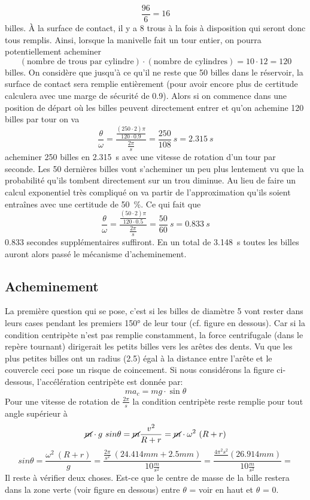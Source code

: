 \[\frac{\num{96}}{\num{6}} = \num{16}\]
billes. À la surface de contact, il y a \num{8} trous à la fois à disposition qui seront donc tous remplis. Ainsi, lorsque la manivelle fait un tour entier, on pourra potentiellement acheminer 
\[(\text{nombre de trous par cylindre}) \cdot (\text{nombre de cylindres}) = \num{10} \cdot \num{12} = \num{120}\]
billes.
On considère que jusqu'à ce qu'il ne reste que \num{50} billes dans le réservoir, la surface de contact sera remplie entièrement (pour avoir encore plus de certitude calculera avec une marge de sécurité de \num{0.9}).
Alors si on commence dans une position de départ où les billes peuvent directement entrer et qu'on achemine \num{120} billes par tour on va
\[\frac{\theta}{\omega} = \frac{\frac{(250 \cdot 2)\pi}{120 \cdot 0.9}}{\frac{2\pi}{s}} = \frac{250}{108} \ s = 2.315 \ s \]
acheminer 250 billes en \SI{2.315}{\s} avec une vitesse de rotation d'un tour par seconde.
Les 50 dernières billes vont s'acheminer un peu plus lentement vu que la probabilité qu'ils tombent directement sur un trou diminue. Au lieu de faire un calcul exponentiel très compliqué on va partir de l'approximation qu'ils soient entraînes avec une certitude de \SI{50}{\percent}. Ce qui fait que
\[\frac{\theta}{\omega} = \frac{\frac{(50 \cdot 2)\pi}{120 \cdot 0.5}}{\frac{2 \pi}{s}} = \frac{50}{60} \ s = 0.833 \ s\]
0.833 secondes supplémentaires suffiront.
En un total de 3.148~s toutes les billes auront alors passé le mécanisme d'acheminement.
\subsection{Acheminement}
La première question qui se pose, c'est si les billes de diamètre 5 vont rester dans leurs cases pendant les premiers \ang{150} de leur tour (cf. figure en dessous). Car si la condition centripète n'est pas remplie constamment, la force centrifugale (dans le repère tournant) dirigerait les petits billes vers les arêtes des dents. Vu que les plus petites billes ont un radius (2.5) égal à la distance entre l'arête et le couvercle ceci pose un risque de coincement. Si nous considérons la figure ci-dessous, l'accélération centripète est donnée par:
\[ma_{c} = mg \cdot \sin\theta\]
Pour une vitesse de rotation de \(\frac{2 \pi}{s}\) la condition centripète reste remplie pour tout angle supérieur à %
\[\cancel{m} \cdot g \ sin\theta = \cancel{m} \frac{v^{2}}{R + r} = \cancel{m} \cdot \omega^{2} \ (R +r)\]
\[sin \theta = \frac{\omega^{2} \ (R + r)}{g} = \frac{\frac{2 \pi}{s^{2}}\ (24.414mm + 2.5mm)}{10\frac{m}{s^{2}}} = \frac{\frac{4 \pi^{2}{s^{2}}} \ (26.914mm)}{10\frac{m}{s^{2}}} = \]
Il reste à vérifier deux choses. Est-ce que le centre de masse de la bille restera dans la zone verte (voir figure en dessous) entre $\theta$ = voir en haut et $\theta$ = 0.
